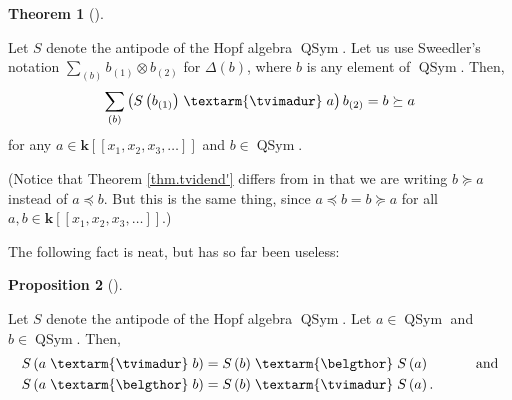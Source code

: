 \documentclass[numbers=enddot,12pt,final,onecolumn,notitlepage]{scrartcl}%
\theoremstyle{definition}
\newtheorem{theo}{Theorem}[section]
\newenvironment{theorem}[1][]
{\begin{theo}[#1]\begin{leftbar}}
{\end{leftbar}\end{theo}}
\newtheorem{prop}[theo]{Proposition}
\newenvironment{proposition}[1][]
{\begin{prop}[#1]\begin{leftbar}}
{\end{leftbar}\end{prop}}
\newenvironment{noncompile}{}{}
\newcommand{\tvi}{\left. \textarm{\tvimadur} \right.}
\newcommand{\bel}{\left. \textarm{\belgthor} \right.}
\let\sumnonlimits\sum
\renewcommand{\sum}{\sumnonlimits\limits}
\begin{document}
\begin{theorem}
\label{thm.tvidend'}Let $S$ denote the antipode of the Hopf algebra
$\operatorname*{QSym}$. Let us use Sweedler's notation $\sum_{\left(
b\right)  }b_{\left(  1\right)  }\otimes b_{\left(  2\right)  }$ for
$\Delta\left(  b\right)  $, where $b$ is any element of $\operatorname*{QSym}%
$. Then,%
\[
\sum_{\left(  b\right)  }\left(  S\left(  b_{\left(  1\right)  }\right)
\tvi  a\right)  b_{\left(  2\right)  }=b\left.  \succeq\right.  a
\]
for any $a\in\mathbf{k}\left[  \left[  x_{1},x_{2},x_{3},\ldots\right]
\right]  $ and $b\in\operatorname*{QSym}$.
\end{theorem}

(Notice that Theorem \ref{thm.tvidend'} differs from \cite[detailed version,
Theorem 3.15]{dimcr} in that we are writing $b\left.  \succeq\right.  a$
instead of $a\left.  \preceq\right.  b$. But this is the same thing, since
$a\left.  \preceq\right.  b=b\left.  \succeq\right.  a$ for all $a,b\in
\mathbf{k}\left[  \left[  x_{1},x_{2},x_{3},\ldots\right]  \right]  $.)

\begin{noncompile}
The following fact is neat, but has so far been useless:

\begin{proposition}
\label{prop.tvibel.antipode}Let $S$ denote the antipode of the Hopf algebra
$\operatorname*{QSym}$. Let $a\in\operatorname*{QSym}$ and $b\in
\operatorname*{QSym}$. Then,%
\begin{align*}
S\left(  a\tvi b\right)   &  =S\left(  b\right)  \bel S\left(  a\right)
\ \ \ \ \ \ \ \ \ \ \text{and}\\
S\left(  a\bel b\right)   &  =S\left(  b\right)  \tvi S\left(  a\right)  .
\end{align*}

\end{proposition}
\end{noncompile}
\end{document}
